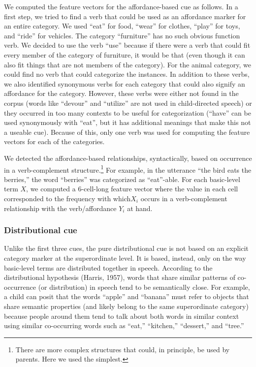 \documentclass[english,,man]{apa6}
\let\rmarkdownfootnote\footnote%
\def\footnote{\protect\rmarkdownfootnote}
\begin{document}
We computed the feature vectors for the affordance-based cue as follows. In a first step, we tried to find a verb that could be used as an affordance marker for an entire category. We used \enquote{eat} for food, \enquote{wear} for clothes, \enquote{play} for toys, and \enquote{ride} for vehicles. The category \enquote{furniture} has no such obvious function verb. We decided to use the verb \enquote{use} because if there were a verb that could fit every member of the category of furniture, it would be that (even though it can also fit things that are not members of the category). For the animal category, we could find no verb that could categorize the instances. In addition to these verbs, we also identified synonymous verbs for each category that could also signify an affordance for the category. However, these verbs were either not found in the corpus (words like \enquote{devour} and \enquote{utilize} are not used in child-directed speech) or they occurred in too many contexts to be useful for categorization (\enquote{have} can be used synonymously with \enquote{eat}, but it has additional meanings that make this not a useable cue). Because of this, only one verb was used for computing the feature vectors for each of the categories.

We detected the affordance-based relationships, syntactically, based on occurrence in a verb-complement structure.\footnote{There are more complex structures that could, in principle, be used by parents. Here we used the simplest.} For example, in the utterance \enquote{the bird eats the berries,} the word \enquote{berries} was categorized as \enquote{eat}-able. For each basic-level term \(X\), we computed a 6-cell-long feature vector where the value in each cell corresponded to the frequency with which\(X_i\) occurs in a verb-complement relationship with the verb/affordance \(Y_i\) at hand.

\hypertarget{distributional-cue}{%
\subsubsection{Distributional cue}\label{distributional-cue}}

Unlike the first three cues, the pure distributional cue is not based on an explicit category marker at the superordinate level. It is based, instead, only on the way basic-level terms are distributed together in speech. According to the distributional hypothesis (Harris, 1957), words that share similar patterns of co-occurrence (or distribution) in speech tend to be semantically close. For example, a child can posit that the words \enquote{apple} and \enquote{banana} must refer to objects that share semantic properties (and likely belong to the same superordinate category) because people around them tend to talk about both words in similar context using similar co-occurring words such as \enquote{eat,} \enquote{kitchen,} \enquote{dessert,} and \enquote{tree.}
\end{document}
